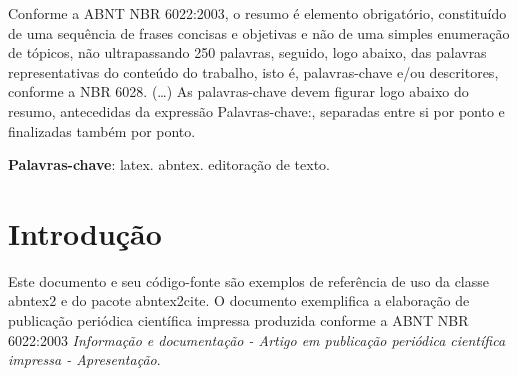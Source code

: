 \documentclass[
	article,			%
	11pt,				%
	oneside,			%
	a4paper,			%
	english,			%
	brazil,				%
	sumario=tradicional
	]{abntex2}
\begin{document}

\frenchspacing 


%
%
\maketitle

\begin{resumoumacoluna}
 Conforme a ABNT NBR 6022:2003, o resumo é elemento obrigatório, constituído de
 uma sequência de frases concisas e objetivas e não de uma simples enumeração
 de tópicos, não ultrapassando 250 palavras, seguido, logo abaixo, das palavras
 representativas do conteúdo do trabalho, isto é, palavras-chave e/ou
 descritores, conforme a NBR 6028. (\ldots) As palavras-chave devem figurar logo
 abaixo do resumo, antecedidas da expressão Palavras-chave:, separadas entre si por
 ponto e finalizadas também por ponto.
 
 \vspace{\onelineskip}
 
 \noindent
 \textbf{Palavras-chave}: latex. abntex. editoração de texto.
\end{resumoumacoluna}


\textual

\section*{Introdução}

Este documento e seu código-fonte são exemplos de referência de uso da classe
\textsf{abntex2} e do pacote \textsf{abntex2cite}. O documento exemplifica a
elaboração de publicação periódica científica impressa produzida conforme a ABNT
NBR 6022:2003 \emph{Informação e documentação - Artigo em publicação periódica
científica impressa - Apresentação}.
\end{document}
